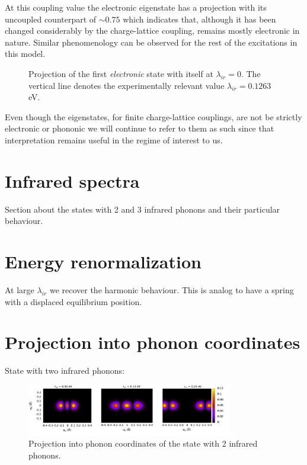 At this coupling value the electronic eigenstate has a projection with its uncoupled counterpart of $\sim 0.75$ which indicates that, although it has been changed considerably by the charge-lattice coupling, remains mostly electronic in nature.
Similar phenomenology can be observed for the rest of the excitations in this model.
%
\begin{figure}
  \centering
  
  \caption[Projection of the first \textit{electronic} state with itself at $\lambda_{ir}=0$.]
  {Projection of the first \textit{electronic} state with itself at $\lambda_{ir}=0$.
    The vertical line denotes the experimentally relevant value $\lambda_{ir}=0.1263$ eV.}
  \label{fig:electr-proj}
\end{figure}

Even though the eigenstates, for finite charge-lattice couplings, are not be strictly electronic or phononic we will continue to refer to them as such since that interpretation remains useful in the regime of interest to us.

\section{Infrared spectra}
Section about the states with 2 and 3 infrared phonons and their particular behaviour.

\section{Energy renormalization}

At large $\lambda_{ir}$ we recover the harmonic behaviour. This is analog to have a spring with a displaced equilibrium position.

\section{Projection into phonon coordinates}

State with two infrared phonons:

\begin{figure}[ht!]
  \centering
  \includegraphics[width=0.8\textwidth]{images/ph-second_infrared.png}
  \caption{Projection into phonon coordinates of the state with 2 infrared phonons.}
  \label{fig:ph-second_infrared}
\end{figure}

